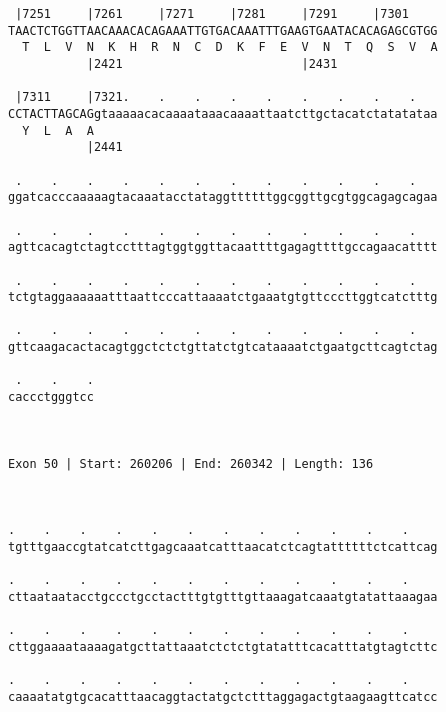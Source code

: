 \documentclass{article}
\begin{document}
\begin{Verbatim}
 |7251     |7261     |7271     |7281     |7291     |7301    
TAACTCTGGTTAACAAACACAGAAATTGTGACAAATTTGAAGTGAATACACAGAGCGTGG
  T  L  V  N  K  H  R  N  C  D  K  F  E  V  N  T  Q  S  V  A
           |2421                         |2431              
  
 |7311     |7321.    .    .    .    .    .    .    .    .   
CCTACTTAGCAGgtaaaaacacaaaataaacaaaattaatcttgctacatctatatataa
  Y  L  A  A                                                
           |2441                                            
  
 .    .    .    .    .    .    .    .    .    .    .    .   
ggatcacccaaaaagtacaaatacctataggttttttggcggttgcgtggcagagcagaa
                                                            
 .    .    .    .    .    .    .    .    .    .    .    .   
agttcacagtctagtcctttagtggtggttacaattttgagagttttgccagaacatttt
                                                            
 .    .    .    .    .    .    .    .    .    .    .    .   
tctgtaggaaaaaatttaattcccattaaaatctgaaatgtgttcccttggtcatctttg
                                                            
 .    .    .    .    .    .    .    .    .    .    .    .   
gttcaagacactacagtggctctctgttatctgtcataaaatctgaatgcttcagtctag
                                                            
 .    .    .
caccctgggtcc
            
            
 
Exon 50 | Start: 260206 | End: 260342 | Length: 136



.    .    .    .    .    .    .    .    .    .    .    .    
tgtttgaaccgtatcatcttgagcaaatcatttaacatctcagtattttttctcattcag
                                                            
.    .    .    .    .    .    .    .    .    .    .    .    
cttaataatacctgccctgcctactttgtgtttgttaaagatcaaatgtatattaaagaa
                                                            
.    .    .    .    .    .    .    .    .    .    .    .    
cttggaaaataaaagatgcttattaaatctctctgtatatttcacatttatgtagtcttc
                                                            
.    .    .    .    .    .    .    .    .    .    .    .    
caaaatatgtgcacatttaacaggtactatgctctttaggagactgtaagaagttcatcc
                                                            

\end{Verbatim}
\end{document}
